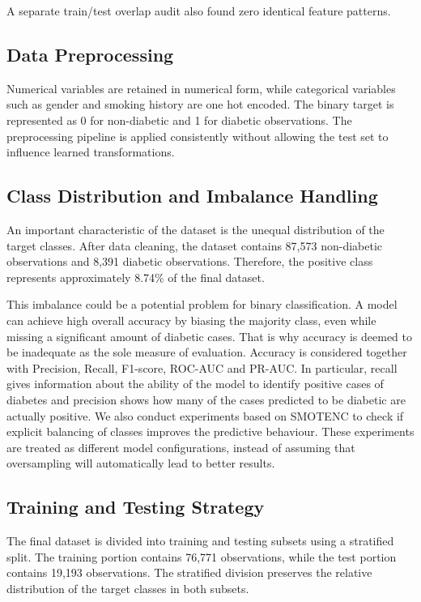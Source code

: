 \documentclass[conference]{IEEEtran}
\begin{document}
A separate train/test overlap audit also found zero identical feature patterns.

\subsection{Data Preprocessing}


Numerical variables are retained in numerical form, while categorical variables such as gender and smoking history are one hot encoded. The binary target is represented as 0 for non-diabetic and 1 for diabetic observations. The preprocessing pipeline is applied consistently without allowing the test set to influence learned transformations.

\subsection{Class Distribution and Imbalance Handling}


An important characteristic of the dataset is the unequal distribution of the target classes. After data cleaning, the dataset contains 87,573 non-diabetic observations and 8,391 diabetic observations. Therefore, the positive class represents approximately 8.74\% of the final dataset.

This imbalance could be a potential problem for binary classification. A model can achieve high overall accuracy by biasing the majority class, even while missing a significant amount of diabetic cases. That is why accuracy is deemed to be inadequate as the sole measure of evaluation. Accuracy is considered together with Precision, Recall, F1-score, ROC-AUC and PR-AUC. In particular, recall gives information about the ability of the model to identify positive cases of diabetes and precision shows how many of the cases predicted to be diabetic are actually positive. We also conduct experiments based on SMOTENC to check if explicit balancing of classes improves the predictive behaviour. These experiments are treated as different model configurations, instead of assuming that oversampling will automatically lead to better results.


\subsection{Training and Testing Strategy}

The final dataset is divided into training and testing subsets using a stratified split. The training portion contains 76,771 observations, while the test portion contains 19,193 observations. The stratified division preserves the relative distribution of the target classes in both subsets.
\end{document}
